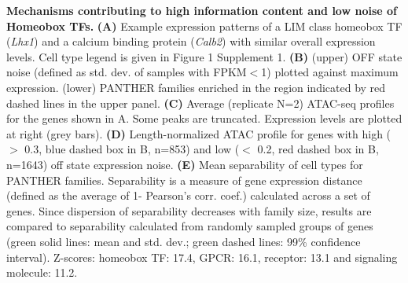 \textbf{Mechanisms contributing to high information content and low noise of Homeobox TFs.}
\textbf{(A)} Example expression patterns of a LIM class homeobox TF (\textit{Lhx1}) and a calcium binding protein (\textit{Calb2}) with  similar overall expression levels. Cell type legend is given in Figure 1 Supplement 1.
\textbf{(B)} (upper) OFF state noise (defined as std. dev. of samples with FPKM$<$1) plotted against maximum expression. (lower) PANTHER families enriched in the region indicated by red dashed lines in the upper panel.
\textbf{(C)} Average (replicate N=2) ATAC-seq profiles for the genes shown in A. Some peaks are truncated. Expression levels are plotted at right (grey bars).
\textbf{(D)} Length-normalized ATAC profile for genes with high ($>$ 0.3, blue dashed box in B, n=853) and low ($<$ 0.2, red dashed box in B, n=1643) off state expression noise.
\textbf{(E)} Mean separability of cell types for PANTHER families. Separability is a measure of gene expression distance (defined as the average of 1- Pearson's corr. coef.) calculated across a set of genes. Since dispersion of separability decreases with family size, results are compared to separability calculated from randomly sampled groups of genes (green solid lines: mean and std. dev.; green dashed lines: 99\% confidence interval). Z-scores: homeobox TF: 17.4, GPCR: 16.1, receptor: 13.1 and signaling molecule: 11.2. 
